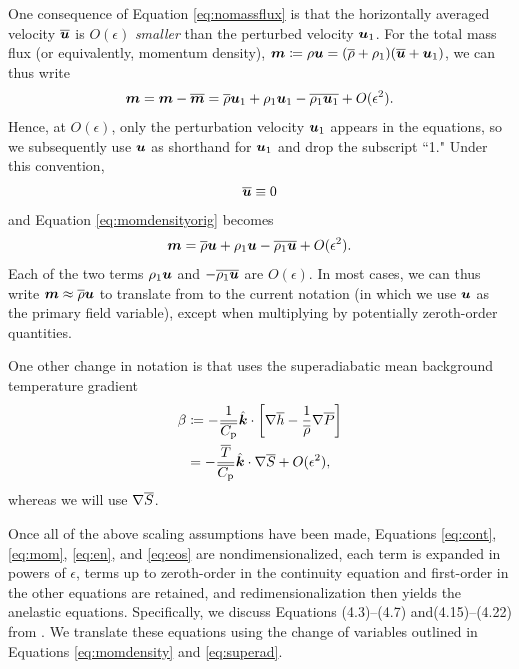 \documentclass[12pt]{article}
\newcommand{\veck}{\hat{\bm{k}}}
\begin{document}
	One consequence of Equation \eqref{eq:nomassflux} is that the horizontally averaged velocity $\overline{\bm{u}}$ is $O(\epsilon)$ \textit{smaller} than the perturbed velocity $\bm{u}_1$. For the total mass flux (or equivalently, momentum density), $\bm{m}\coloneqq \rho\bm{u}=(\overline{\rho}+\rho_1)(\overline{\bm{u}}+\bm{u}_1)$, we can thus write
		\begin{align}\label{eq:momdensityorig}
		\bm{m} = \bm{m}-\overline{\bm{m}}=\overline{\rho}\bm{u}_1 + \rho_1\bm{u}_1 - \overline{\rho_1\bm{u}_1} + O(\epsilon^2).
	\end{align}
	Hence, at $O(\epsilon)$, only the perturbation velocity $\bm{u}_1$ appears in the equations, so we subsequently use $\bm{u}$ as shorthand for $\bm{u}_1$ and drop the subscript ``1." Under this convention,
\begin{align}\label{eq:nomeanu}
	\overline{\bm{u}}\equiv0
\end{align}
	and Equation \eqref{eq:momdensityorig} becomes
	\begin{align}\label{eq:momdensity}
		\bm{m} = \overline{\rho}\bm{u} + \rho_1\bm{u} - \overline{\rho_1\bm{u}} + O(\epsilon^2).
	\end{align}
	Each of the two terms $\rho_1\bm{u}$ and $-\overline{\rho_1\bm{u}}$ are $O(\epsilon)$. In most cases, we can thus write $\bm{m} \approx \overline{\rho} \bm{u}$ to translate from \citet{Gough1969} to the current notation (in which we use $\bm{u}$ as the primary field variable), except when multiplying by potentially zeroth-order quantities.
	
	 One other change in notation is that \citet{Gough1969} uses the superadiabatic mean background temperature gradient
	\begin{align}\label{eq:superad}
		\beta &\define -\frac{1}{\cpover}\veck\cdot\left[\nabla\overline{h}-\frac{1}{\rhoover}\nabla\prsover\right]\nonumber\\
		&=-\frac{\tmpover}{\cpover}\veck\dotgrad\entrover + O(\epsilon^2),
	\end{align}
	whereas we will use $\nabla \overline{S}$. 
	
	Once all of the above scaling assumptions have been made, Equations \eqref{eq:cont}, \eqref{eq:mom}, \eqref{eq:en}, and \eqref{eq:eos} are nondimensionalized, each term is expanded in powers of $\epsilon$, terms up to zeroth-order in the continuity equation and first-order in the other equations are retained, and redimensionalization then yields the anelastic equations. Specifically, we discuss Equations (4.3)--(4.7) and(4.15)--(4.22) from \citet{Gough1969}. We translate these equations using the change of variables outlined in Equations \eqref{eq:momdensity} and \eqref{eq:superad}. 
	
\end{document}
